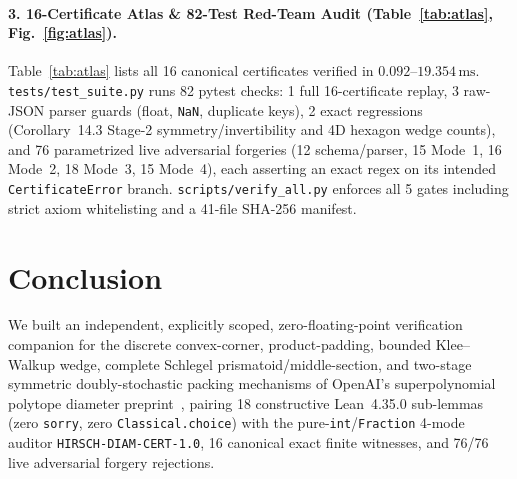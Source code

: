 \documentclass[10pt,twocolumn]{article}
\begin{document}
\paragraph{3. 16-Certificate Atlas \& 82-Test Red-Team Audit (Table~\ref{tab:atlas}, Fig.~\ref{fig:atlas}).}
Table~\ref{tab:atlas} lists all 16 canonical certificates verified in $0.092$--$19.354\,\mathrm{ms}$. \texttt{tests/test\_\allowbreak suite.py} runs 82 pytest checks: 1 full 16-certificate replay, 3 raw-JSON parser guards (float, \texttt{NaN}, duplicate keys), 2 exact regressions (Corollary~14.3 Stage-2 symmetry/invertibility and 4D hexagon wedge counts), and 76 parametrized live adversarial forgeries (12 schema/parser, 15 Mode~1, 16 Mode~2, 18 Mode~3, 15 Mode~4), each asserting an exact regex on its intended \texttt{CertificateError} branch. \texttt{scripts/verify\_\allowbreak all.py} enforces all 5 gates including strict axiom whitelisting and a 41-file SHA-256 manifest.

\section{Conclusion}\label{sec:conc}
We built an independent, explicitly scoped, zero-floating-point verification companion for the discrete convex-corner, product-padding, bounded Klee--Walkup wedge, complete Schlegel prismatoid/middle-section, and two-stage symmetric doubly-stochastic packing mechanisms of OpenAI's superpolynomial polytope diameter preprint~\cite{openai2026hirsch}, pairing 18 constructive Lean~4.35.0 sub-lemmas (zero \texttt{sorry}, zero \texttt{Classical.choice}) with the pure-\texttt{int}/\texttt{Fraction} 4-mode auditor \texttt{HIRSCH-\allowbreak DIAM-\allowbreak CERT-1.0}, 16 canonical exact finite witnesses, and 76/76 live adversarial forgery rejections.

{\footnotesize

}
\end{document}
